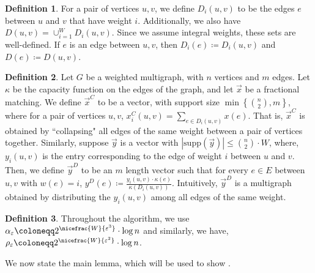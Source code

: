 \documentclass[a4paper,11pt]{article}
\newcommand{\card}[1]{|#1|}
\newcommand{\set}[1]{\ensuremath{\left\{ #1 \right\}}}
\newcommand{\eps}{\varepsilon}
\theoremstyle{definition}
\newtheorem{definition2}{Definition}
\theoremstyle{definition}
\theoremstyle{definition}
\theoremstyle{definition}
\theoremstyle{definition}
\theoremstyle{definition}
\theoremstyle{definition}
\theoremstyle{definition}
\theoremstyle{definition}
\theoremstyle{definition}
\theoremstyle{definition}
\theoremstyle{definition}
\theoremstyle{definition}
\theoremstyle{definition}
\theoremstyle{definition}
\begin{document}
\begin{definition2}
For a pair of vertices $u,v$, we define $D_i(u,v)$ to be the edges $e$ between $u$ and $v$ that have weight $i$. Additionally, we also have $D(u,v)=\cup_{i=1}^W D_{i}(u,v)$. Since we assume integral weights, these sets are well-defined. If $e$ is an edge between $u,v$, then $D_i(e)\coloneqq D_i(u,v)$ and $D(e)\coloneqq D(u,v)$.
\end{definition2}

\begin{definition2}
Let $G$ be a weighted multigraph, with $n$ vertices and $m$ edges. Let $\kappa$ be the capacity function on the edges of the graph, and let $\vec{x}$ be a fractional matching. We define $\vec{x}^C$ to be a vector, with support size $\min\set{{n\choose 2}, m}$, where for a pair of vertices $u,v$, $x^C_{i}(u,v)=\sum_{e\in D_i(u,v)}x(e)$. That is, $\vec{x}^C$ is obtained by ``collapsing" all edges of the same weight between a pair of vertices together. Similarly, suppose $\vec{y}$ is a vector with $\card{\text{supp}(\vec{y})}\leqslant {n\choose 2}\cdot W$, where, $y_i(u,v)$ is the entry corresponding to the edge of weight $i$ between $u$ and $v$. Then, we define $\vec{y}^D$ to be an $m$ length vector such that for every $e\in E$ between $u,v$ with $w(e)=i$, $y^D(e)\coloneqq \frac{y_i(u,v)\cdot \kappa(e)}{\kappa(D_{i}(u,v))}$. Intuitively, $
\vec{y}^D$ is a multigraph obtained by distributing the $y_i(u,v)$ among all edges of the same weight.
\end{definition2}

\begin{definition2}
Throughout the algorithm, we use $\alpha_{\eps}\coloneqq 2^{\nicefrac{W}{\eps^3}}\cdot \log n$ and similarly, we have, $\rho_{\eps}\coloneqq 2^{\nicefrac{W}{\eps^2}}\cdot \log n$.
\end{definition2}

We now state the main lemma, which will be used to show .
\end{document}
